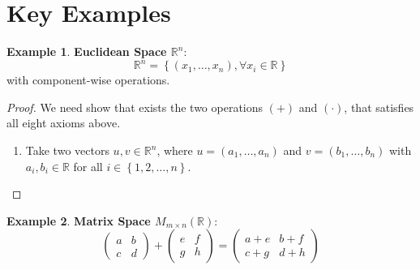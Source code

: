 \documentclass{article}
\theoremstyle{plain}
\theoremstyle{definition}
\newtheorem{example}{Example}[section]
\theoremstyle{remark}
\newcommand{\thmheader}[1]{%
  \textcolor{#1}{\normalfont\bfseries}%
}
\begin{document}
\section{Key Examples}
\begin{example}
\thmheader{excolor}\textbf{Euclidean Space $\mathbb{R}^n$}:
\[
\mathbb{R}^n = \left\{ (x_1, \hdots, x_n), \forall x_i \in \mathbb{R} \right\}
\]
with component-wise operations.
    \begin{proof}
        We need show that exists the two operations $(+)$ and $(\cdot)$, that satisfies all eight axioms above.
        \begin{enumerate}[label=(V\arabic*),leftmargin=*]
            \item Take two vectors $u, v \in \mathbb{R}^n$, where $u = (a_1, \ldots, a_n)$ and $v = (b_1, \ldots, b_n)$ with $a_i, b_i \in \mathbb{R}$ for all $i \in \left\{1, 2, \ldots, n \right\}$.
        \end{enumerate}
    \end{proof}
\end{example}

\begin{example}
\thmheader{excolor}\textbf{Matrix Space $M_{m \times n}(\mathbb{R})$}:
\[
\begin{pmatrix} a & b \\ c & d \end{pmatrix} + \begin{pmatrix} e & f \\ g & h \end{pmatrix} = \begin{pmatrix} a+e & b+f \\ c+g & d+h \end{pmatrix}
\]
\end{example}
\end{document}
